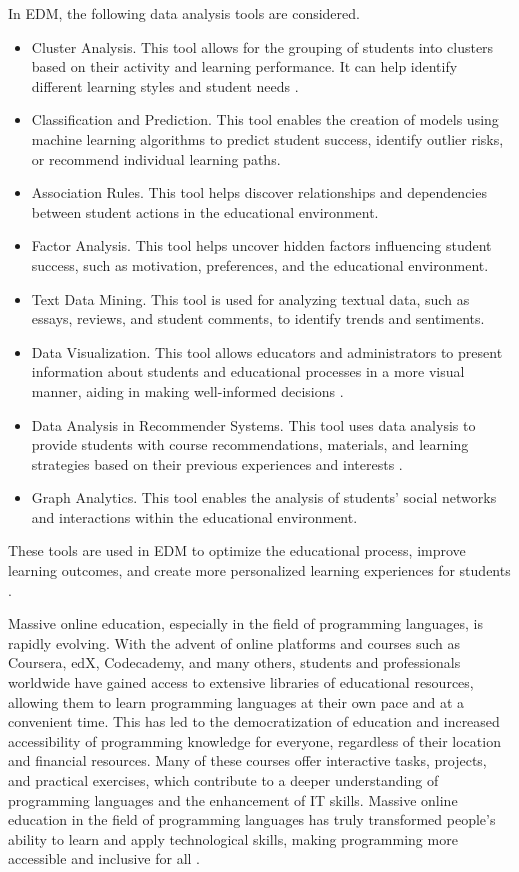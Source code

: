 \documentclass{article}
\begin{document}
\begin{multicols}{2}
\begin{justify}
      In EDM, the following data analysis tools are considered.
      \begin{itemize}
        \item Cluster Analysis. This tool allows for the grouping of students into clusters based on their activity and learning performance. It can help identify different learning styles and student needs \cite{3}.
        \item Classification and Prediction. This tool enables the creation of models using machine learning algorithms to predict student success, identify outlier risks, or recommend individual learning paths.
        \item Association Rules. This tool helps discover relationships and dependencies between student actions in the educational environment.
        \item Factor Analysis. This tool helps uncover hidden factors influencing student success, such as motivation, preferences, and the educational environment.
        \item Text Data Mining. This tool is used for analyzing textual data, such as essays, reviews, and student comments, to identify trends and sentiments.
        \item Data Visualization. This tool allows educators and administrators to present information about students and educational processes in a more visual manner, aiding in making well-informed decisions \cite{2}.
        \item Data Analysis in Recommender Systems. This tool uses data analysis to provide students with course recommendations, materials, and learning strategies based on their previous experiences and interests \cite{5}.
        \item Graph Analytics. This tool enables the analysis of students' social networks and interactions within the educational environment.
      \end{itemize}

      These tools are used in EDM to optimize the educational process, improve learning outcomes, and create more personalized learning experiences for students \cite{6}.

      Massive online education, especially in the field of programming languages, is rapidly evolving. With the advent of online platforms and courses such as Coursera, edX, Codecademy, and many others, students and professionals worldwide have gained access to extensive libraries of educational resources, allowing them to learn programming languages at their own pace and at a convenient time. This has led to the democratization of education and increased accessibility of programming knowledge for everyone, regardless of their location and financial resources. Many of these courses offer interactive tasks, projects, and practical exercises, which contribute to a deeper understanding of programming languages and the enhancement of IT skills. Massive online education in the field of programming languages has truly transformed people's ability to learn and apply technological skills, making programming more accessible and inclusive for all \cite{7}.


\end{justify}
\end{multicols}
\end{document}
